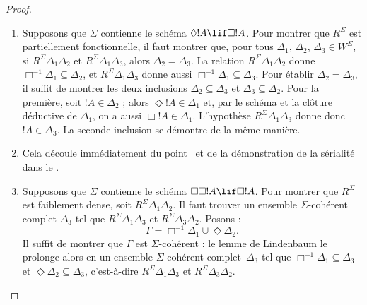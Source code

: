 \documentclass[../../../include/open-logic-section]{subfiles}
\begin{document}
\begin{proof}
  \begin{enumerate}
  \item Supposons que $\Sigma$ contienne le schéma $\Diamond !A \lif
    \Box !A$. Pour montrer que $R^\Sigma$ est partiellement
    fonctionnelle, il faut montrer que, pour tous $\Delta_1$,
    $\Delta_2$, $\Delta_3 \in W^\Sigma$, si $R^\Sigma
    \Delta_1\Delta_2$ et $R^\Sigma \Delta_1\Delta_3$, alors
    $\Delta_2=\Delta_3$. La relation $R^\Sigma \Delta_1\Delta_2$
    donne $\Box^{-1}\Delta_1 \subseteq \Delta_2$, et $R^\Sigma
    \Delta_1\Delta_3$ donne aussi $\Box^{-1}\Delta_1
    \subseteq \Delta_3$. Pour établir
    $\Delta_2=\Delta_3$, il suffit de montrer les deux inclusions
    $\Delta_2 \subseteq \Delta_3$ et $\Delta_3 \subseteq
    \Delta_2$. Pour la première, soit $!A \in \Delta_2$ ; alors
    $\Diamond!A \in \Delta_1$ et, par le schéma et la clôture déductive
    de $\Delta_1$, on a aussi $\Box!A \in \Delta_1$. L'hypothèse
    $R^\Sigma \Delta_1\Delta_3$ donne donc $!A \in \Delta_3$. La
    seconde inclusion se démontre de la même manière.

  \item Cela découle immédiatement du point~
    et de la démonstration de la sérialité dans le
    .

  \item Supposons que $\Sigma$ contienne le schéma $\Box\Box!A \lif \Box!A$.
    Pour montrer que $R^\Sigma$ est faiblement dense, soit $R^\Sigma
    \Delta_1\Delta_2$. Il faut trouver un ensemble $\Sigma$-cohérent
    complet $\Delta_3$ tel que $R^\Sigma
    \Delta_1\Delta_3$ et $R^\Sigma \Delta_3\Delta_2$. Posons :
    \[
    \Gamma = \Box^{-1}\Delta_1 \cup \Diamond\Delta_2.
    \]
    Il suffit de montrer que $\Gamma$ est $\Sigma$-cohérent : le lemme
    de Lindenbaum le prolonge alors en un ensemble $\Sigma$-cohérent
    complet~$\Delta_3$ tel que $\Box^{-1}\Delta_1
    \subseteq \Delta_3$ et $\Diamond\Delta_2 \subseteq \Delta_3$,
    c'est-à-dire $R^\Sigma \Delta_1\Delta_3$ et $R^\Sigma
    \Delta_3\Delta_2$.


\end{enumerate}
\end{proof}
\end{document}

